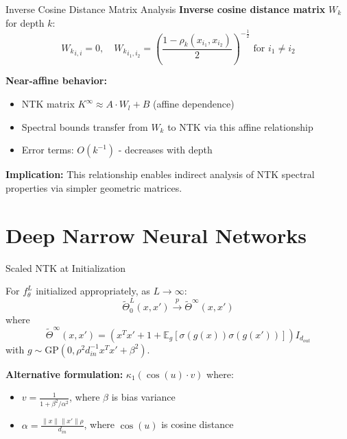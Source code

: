 \documentclass{beamer}
\newcommand{\E}{\mathbb{E}}
\begin{document}
\begin{frame}{Inverse Cosine Distance Matrix Analysis}
\textbf{Inverse cosine distance matrix} $W_k$ for depth $k$:
\[ {W_k}_{i,i} = 0, \quad {W_k}_{i_1,i_2} = \left( \frac{1 - \rho_k(x_{i_1},x_{i_2})}{2} \right)^{-\frac{1}{2}} \text{ for } i_1 \neq i_2 \]

\textbf{Near-affine behavior:}
\begin{itemize}
\item NTK matrix $K^{\infty} \approx A \cdot W_l + B$ (affine dependence)
\item Spectral bounds transfer from $W_k$ to NTK via this affine relationship
\item Error terms: $O(k^{-1})$ - decreases with depth
\end{itemize}

\textbf{Implication:} This relationship enables indirect analysis of NTK spectral properties via simpler geometric matrices.
\end{frame}

\section{Deep Narrow Neural Networks}

\begin{frame}{Scaled NTK at Initialization}
\begin{theorem}
For $f^L_\theta$ initialized appropriately, as $L \to \infty$:
\[ \tilde{\Theta}^L_0(x, x') \xrightarrow{p} \tilde{\Theta}^\infty(x, x') \]
where
\[ \tilde{\Theta}^\infty(x, x') = (x^T x' + 1 + \E_g[\sigma(g(x))\sigma(g(x'))]) I_{d_{out}} \]
with $g \sim \text{GP}(0, \rho^2 d_{in}^{-1} x^T x' + \beta^2)$.
\end{theorem}

\textbf{Alternative formulation:} $\kappa_1(\cos(u) \cdot v)$ where:
\begin{itemize}
\item $v = \frac{1}{1 + \beta^2/\alpha^2}$, where $\beta$ is bias variance
\item $\alpha = \frac{\|x\| \|x'\| \rho}{d_{in}}$, where $\cos(u)$ is cosine distance
\end{itemize}
\end{frame}
\end{document}
